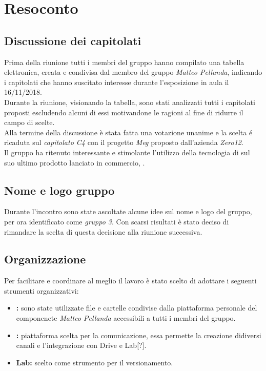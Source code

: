 \clearpage
\section{Resoconto}
\subsection{Discussione dei capitolati}
	Prima della riunione tutti i membri del gruppo hanno compilato una tabella elettronica, creata e condivisa dal membro del gruppo \emph{Matteo Pellanda}, indicando i capitolati che hanno suscitato interesse durante l'esposizione in aula il 16/11/2018. \\
	Durante la  riunione, visionando la tabella, sono stati analizzati tutti  i  capitolati proposti escludendo alcuni di essi motivandone le ragioni al fine di ridurre il campo di scelte. \\
	Alla termine della discussione è stata fatta una votazione unanime e la scelta é ricaduta sul \emph{capitolato C4} con il progetto \emph{Meg} proposto dall’azienda \emph{Zero12}. \\ 
	Il gruppo ha ritenuto interessante e stimolante l’utilizzo della tecnologia  di  sul suo ultimo prodotto lanciato in commercio,  .
	
	\subsection{Nome e logo gruppo}
	Durante l'incontro sono state ascoltate alcune idee sul nome e logo del gruppo, per ora identificato come \emph{gruppo 3}.
	Con scarsi risultati è stato deciso di rimandare la scelta di questa decisione  alla riunione successiva.
	
	\subsection{Organizzazione}
	Per facilitare e coordinare al meglio il lavoro è stato scelto di adottare i seguenti strumenti organizzativi:
	\begin{itemize}
		\item \textbf{:} sono state utilizzate file e cartelle condivise dalla piattaforma  personale del componenete \emph{Matteo Pellanda} accessibili a tutti i membri del gruppo.
		\item \textbf{:} piattaforma scelta per la comunicazione, essa permette la creazione didiversi canali e l’integrazione con Drive e Lab[?].
		\item \textbf{ Lab:} scelto come strumento per il versionamento.
		
	\end{itemize}
